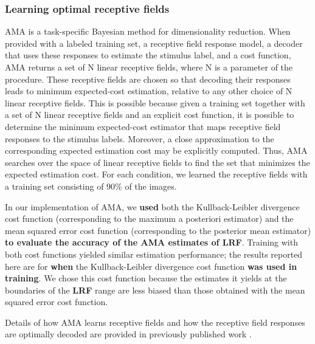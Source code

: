 \documentclass{jov}
\providecommand{\DIFaddtex}[1]{{\bf #1}} %
\providecommand{\DIFdeltex}[1]{} %
\providecommand{\DIFaddbegin}{} %
\providecommand{\DIFaddend}{} %
\providecommand{\DIFdelbegin}{} %
\providecommand{\DIFdelend}{} %
\providecommand{\DIFadd}[1]{\texorpdfstring{\DIFaddtex{#1}}{#1}} %
\providecommand{\DIFdel}[1]{\texorpdfstring{\DIFdeltex{#1}}{}} %
\newcommand{\DIFscaledelfig}{0.5}
\newlength{\DIFdelgraphicswidth} %
\newlength{\DIFdelgraphicsheight} %
\newcommand{\DIFaddincludegraphics}[2][]{{\color{blue}\fbox{\DIFOincludegraphics[#1]{#2}}}} %
\newcommand{\DIFdelincludegraphics}[2][]{%
\sbox{\DIFdelgraphicsbox}{\DIFOincludegraphics[#1]{#2}}%
\settoboxwidth{\DIFdelgraphicswidth}{\DIFdelgraphicsbox} %
\settoboxtotalheight{\DIFdelgraphicsheight}{\DIFdelgraphicsbox} %
\scalebox{\DIFscaledelfig}{%
\parbox[b]{\DIFdelgraphicswidth}{\usebox{\DIFdelgraphicsbox}\\[-\baselineskip] \rule{\DIFdelgraphicswidth}{0em}}\llap{\resizebox{\DIFdelgraphicswidth}{\DIFdelgraphicsheight}{%
\setlength{\unitlength}{\DIFdelgraphicswidth}%
\begin{picture}(1,1)%
\thicklines\linethickness{2pt} %
{\color[rgb]{1,0,0}\put(0,0){\framebox(1,1){}}}%
{\color[rgb]{1,0,0}\put(0,0){\line( 1,1){1}}}%
{\color[rgb]{1,0,0}\put(0,1){\line(1,-1){1}}}%
\end{picture}%
}\hspace*{3pt}}} %
} %
\DeclareRobustCommand{\DIFaddbegin}{\DIFOaddbegin \let\includegraphics\DIFaddincludegraphics} %
\DeclareRobustCommand{\DIFaddend}{\DIFOaddend \let\includegraphics\DIFOincludegraphics} %
\DeclareRobustCommand{\DIFdelbegin}{\DIFOdelbegin \let\includegraphics\DIFdelincludegraphics} %
\DeclareRobustCommand{\DIFdelend}{\DIFOaddend \let\includegraphics\DIFOincludegraphics} %
\begin{document}
\subsubsection*{Learning optimal receptive fields}
AMA is a task-specific Bayesian method for dimensionality reduction.
When provided with a labeled training set, a receptive field response model, a decoder that uses these responses to estimate the stimulus label, and a cost function, AMA returns a set of N linear receptive fields, where N is a parameter of the procedure.
These receptive fields are chosen so that decoding their responses leads to minimum expected-cost estimation, relative to any other choice of N linear receptive fields.
This is possible because given a training set together with a set of N linear receptive fields and an explicit cost function, it is possible to determine the minimum expected-cost estimator that maps receptive field responses to the stimulus labels.
Moreover, a close approximation to the corresponding expected estimation cost may be explicitly computed.
Thus, AMA searches over the space of linear receptive fields to find the set that minimizes the expected estimation cost.
For each condition, we learned the receptive fields with a training set consisting of 90\% of the images.

In our implementation of AMA, we \DIFdelbegin \DIFdel{explored }\DIFdelend \DIFaddbegin \DIFadd{used }\DIFaddend both the Kullback-Leibler divergence cost function (corresponding to the maximum a posteriori estimator) and the mean squared error cost function (corresponding to the posterior mean estimator) \DIFdelbegin \DIFdel{and assumed that receptive field responses were corrupted by scaled Gaussian noise (i.e. Poisson-like noise with a fano factor of 1.3)}\DIFdelend \DIFaddbegin \DIFadd{to evaluate the accuracy of the AMA estimates of LRF}\DIFaddend .
Training with both cost functions yielded similar estimation performance; the results reported here are for \DIFaddbegin \DIFadd{when }\DIFaddend the Kullback-Leibler divergence cost function \DIFaddbegin \DIFadd{was used in training}\DIFaddend .
We chose this cost function because the estimates it yields at the boundaries of the \DIFdelbegin \DIFdel{LRV }\DIFdelend \DIFaddbegin \DIFadd{LRF }\DIFaddend range are less biased than those obtained with the mean squared error cost function.

Details of how AMA learns receptive fields and how the receptive field responses are optimally decoded are provided in previously published work \cite{geisler2009optimal,burge2017accuracy,jaini2017linking}.
\end{document}
